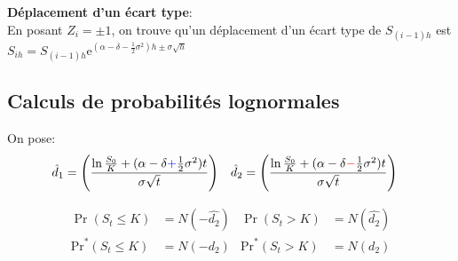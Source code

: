 \documentclass[10pt, french]{article}
\begin{document}
\begin{multicols*}{2}
\textbf{Déplacement d'un écart type}:\\
En posant $Z_{i}	=	\pm 1$, on trouve qu'un déplacement d'un écart type de $S_{(i - 1)h}$ est $S_{ih}	=	S_{(i - 1)h}\textrm{e}^{(\alpha	-	\delta	-	\frac{1}{2}\sigma^{2})h \pm \sigma \sqrt{h}}$


\columnbreak
\subsection*{Calculs de probabilités lognormales}
On pose:
\begin{align*}
	\hat{d}_{1}
	&=	\left(
			\frac{\ln\frac{S_{0}}{K} + (\alpha - \delta {\color{blue}+} \frac{1}{2}\sigma^{2})t}
	 			 {\sigma\sqrt{t}}
		\right)	&
	\hat{d}_{2}
	&=	\left(
			\frac{\ln\frac{S_{0}}{K} + (\alpha - \delta {\color{red}-} \frac{1}{2}\sigma^{2})t}
	 			 {\sigma\sqrt{t}}
		\right)
\end{align*}

\begin{distributions}
\begin{align*}
	\Pr(S_{t}	\leq		K) 
	&=	N(-\hat{d_{2}})	&
	\Pr(S_{t}	>		K) 
	&=	N(\hat{d_{2}})	\\
	\text{Pr}^{*}(S_{t}	\leq		K) 
	&=	N(-d_{2})	&
	\text{Pr}^{*}(S_{t}	>		K) 
	&=	N(d_{2})	
\end{align*}
\end{distributions}



\end{multicols*}
\end{document}
